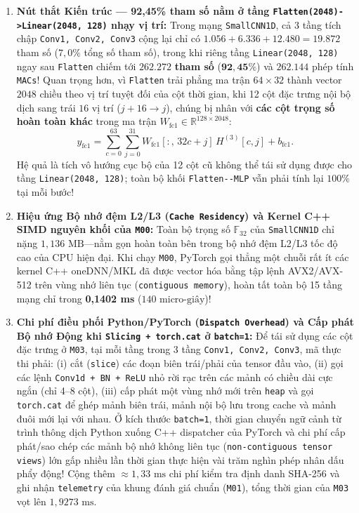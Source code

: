 \documentclass[11pt,a4paper]{article}
\newcommand{\R}{\mathbb{R}}
\newcommand{\F}{\mathbb{F}}
\newcommand{\code}[1]{{\small\ttfamily\nolinkurl{#1}}}
\begin{document}
\begin{enumerate}
  \item \textbf{Nút thắt Kiến trúc --- 92,45\% tham số nằm ở tầng \code{Flatten(2048)->Linear(2048, 128)} nhạy vị trí:}
  Trong mạng \code{SmallCNN1D}, cả 3 tầng tích chập \code{Conv1, Conv2, Conv3} cộng lại chỉ có $1.056 + 6.336 + 12.480 = 19.872$ tham số ($7,0\%$ tổng số tham số), trong khi riêng tầng \code{Linear(2048, 128)} ngay sau \code{Flatten} chiếm tới $\mathbf{262.272}$ \textbf{tham số} ($\mathbf{92,45\%}$) và $262.144$ phép tính \code{MACs}!
  Quan trọng hơn, vì \code{Flatten} trải phẳng ma trận $64 \times 32$ thành vector $2048$ chiều theo vị trí tuyệt đối của cột thời gian, khi 12 cột đặc trưng nội bộ dịch sang trái $16$ vị trí ($j+16 \to j$), chúng bị nhân với \textbf{các cột trọng số hoàn toàn khác} trong ma trận $W_{\text{fc1}} \in \R^{128 \times 2048}$:
  \begin{equation}
    y_{\text{fc1}} = \sum_{c=0}^{63} \sum_{j=0}^{31} W_{\text{fc1}}[:, \, 32c + j] \, H^{(3)}[c, j] + b_{\text{fc1}}.
  \end{equation}
  Hệ quả là tích vô hướng cục bộ của 12 cột cũ không thể tái sử dụng được cho tầng \code{Linear(2048, 128)}; toàn bộ khối \code{Flatten--MLP} vẫn phải tính lại $100\%$ tại mỗi bước!
  \item \textbf{Hiệu ứng Bộ nhớ đệm L2/L3 (\code{Cache Residency}) và Kernel C++ SIMD nguyên khối của \code{M00}:}
  Toàn bộ trọng số $\F_{32}$ của \code{SmallCNN1D} chỉ nặng $1,136\text{ MB}$---nằm gọn hoàn toàn bên trong bộ nhớ đệm L2/L3 tốc độ cao của CPU hiện đại. Khi chạy \code{M00}, PyTorch gọi thẳng một chuỗi rất ít các kernel C++ oneDNN/MKL đã được vector hóa bằng tập lệnh AVX2/AVX-512 trên vùng nhớ liên tục (\code{contiguous memory}), hoàn tất toàn bộ 15 tầng mạng chỉ trong \textbf{0,1402 ms} ($140\text{ micro-giây}$)!
  \item \textbf{Chi phí điều phối Python/PyTorch (\code{Dispatch Overhead}) và Cấp phát Bộ nhớ Động khi \code{Slicing + torch.cat} ở \code{batch=1}:}
  Để tái sử dụng các cột đặc trưng ở \code{M03}, tại mỗi tầng trong 3 tầng \code{Conv1, Conv2, Conv3}, mã thực thi phải: (i) cắt (\code{slice}) các đoạn biên trái/phải của tensor đầu vào, (ii) gọi các lệnh \code{Conv1d + BN + ReLU} nhỏ rời rạc trên các mảnh có chiều dài cực ngắn (chỉ 4--8 cột), (iii) cấp phát một vùng nhớ mới trên \code{heap} và gọi \code{torch.cat} để ghép mảnh biên trái, mảnh nội bộ lưu trong cache và mảnh đuôi mới lại với nhau. Ở kích thước \code{batch=1}, thời gian chuyển ngữ cảnh từ trình thông dịch Python xuống C++ dispatcher của PyTorch và chi phí cấp phát/sao chép các mảnh bộ nhớ không liên tục (\code{non-contiguous tensor views}) lớn gấp nhiều lần thời gian thực hiện vài trăm nghìn phép nhân dấu phẩy động! Cộng thêm $\approx 1,33\text{ ms}$ chi phí kiểm tra định danh SHA-256 và ghi nhận \code{telemetry} của khung đánh giá chuẩn (\code{M01}), tổng thời gian của \code{M03} vọt lên $1,9273\text{ ms}$.
\end{enumerate}
\end{document}
